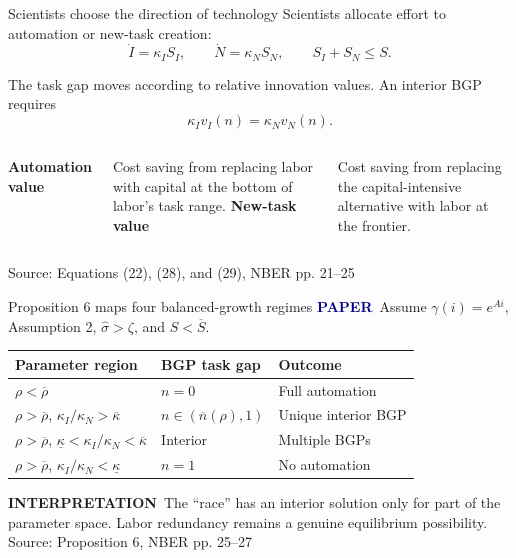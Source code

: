 \documentclass[aspectratio=169,11pt]{beamer}
\newcommand{\source}[1]{\vfill{\tiny\color{muted}Source: #1}}
\newcommand{\paper}{\textcolor{navy}{\textbf{PAPER}}}
\newcommand{\interpretation}{\textcolor{muted}{\textbf{INTERPRETATION}}}
\begin{document}
\begin{frame}{Scientists choose the direction of technology}
  Scientists allocate effort to automation or new-task creation:
  \[
    \dot I=\kappa_I S_I,
    \qquad
    \dot N=\kappa_N S_N,
    \qquad
    S_I+S_N\le S.
  \]

  The task gap moves according to relative innovation values. An interior BGP requires
  \[
    \boxed{\kappa_Iv_I(n)=\kappa_Nv_N(n)}.
  \]

  \begin{columns}[T,onlytextwidth]
    \textbf{Automation value}

    Cost saving from replacing labor with capital at the bottom of labor's task range.
    \textbf{New-task value}

    Cost saving from replacing the capital-intensive alternative with labor at the frontier.
  \end{columns}
  \source{Equations (22), (28), and (29), NBER pp. 21--25}
\end{frame}

\begin{frame}{Proposition 6 maps four balanced-growth regimes}
  \paper\ Assume $\gamma(i)=e^{Ai}$, Assumption 2, $\widehat\sigma>\zeta$, and $S<\overline S$.

  \medskip
  \begin{tabular}{>{\raggedright\arraybackslash}p{}p{}p{}}
    \toprule
    Parameter region & BGP task gap & Outcome \\
    \midrule
    $\rho<\overline\rho$ & $n=0$ & Full automation \\
    $\rho>\overline\rho$, $\kappa_I/\kappa_N>\overline\kappa$ & $n\in(\overline n(\rho),1)$ & Unique interior BGP \\
    $\rho>\overline\rho$, $\underline\kappa<\kappa_I/\kappa_N<\overline\kappa$ & Interior & Multiple BGPs \\
    $\rho>\overline\rho$, $\kappa_I/\kappa_N<\underline\kappa$ & $n=1$ & No automation \\
    \bottomrule
  \end{tabular}

  \medskip
  \interpretation\ The ``race'' has an interior solution only for part of the parameter space. Labor redundancy remains a genuine equilibrium possibility.
  \source{Proposition 6, NBER pp. 25--27}
\end{frame}
\end{document}
